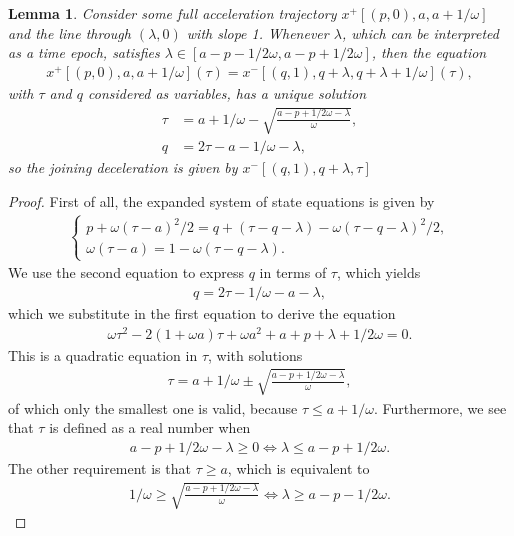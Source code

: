 \documentclass[a4paper]{article}
\theoremstyle{definition}
\theoremstyle{plain}
\newtheorem{lemma}{Lemma}
\begin{document}
\begin{lemma}
  \label{lemma:line_acc}
  Consider some full acceleration trajectory $x^{+}[(p, 0), a, a+1/\omega]$ and the
  line through $(\lambda, 0)$ with slope 1. Whenever $\lambda$, which can be
  interpreted as a time epoch, satisfies $\lambda \in [a-p-1/2\omega, a-p+1/2\omega]$, then the equation
  \begin{align*}
    x^{+}[(p, 0), a, a+1/\omega](\tau) = x^{-}[(q, 1), q + \lambda, q + \lambda + 1/\omega](\tau) ,
  \end{align*}
  with $\tau$ and $q$ considered as variables, has a unique solution
  \begin{align*}
    \tau &= a + 1/\omega - \sqrt{\frac{a - p + 1/2\omega - \lambda}{\omega}} , \\
    q &= 2\tau - a - 1/\omega - \lambda ,
  \end{align*}
  so the joining deceleration is given by $x^{-}[(q,1), q + \lambda, \tau]$
\end{lemma}
\begin{proof}
  First of all, the expanded system of state equations is given by
  \begin{align*}
    \begin{cases}
    p + \omega (\tau - a)^{2}/2 = q + (\tau - q - \lambda) - \omega (\tau - q - \lambda)^{2}/2 , \\
    \omega(\tau - a) = 1 - \omega(\tau - q - \lambda) .
      \end{cases}
  \end{align*}
  We use the second equation to express $q$ in terms of $\tau$, which yields
  \begin{align*}
    q = 2\tau - 1/\omega -a - \lambda ,
  \end{align*}
  which we substitute in the first equation to derive the equation
  \begin{align*}
    \omega \tau^{2}  - 2 (1 + \omega a) \tau + \omega a^{2} + a + p + \lambda + 1/2\omega = 0 .
  \end{align*}
  This is a quadratic equation in $\tau$, with solutions
  \begin{align*}
    \tau = a + 1/\omega \pm \sqrt{\frac{a - p + 1/2\omega - \lambda}{\omega}} ,
  \end{align*}
  of which only the smallest one is valid, because $\tau \leq a + 1/\omega$.
  Furthermore, we see that $\tau$ is defined as a real number when
  \begin{align*}
    a - p + 1/2\omega - \lambda \geq 0 \iff \lambda \leq a - p + 1/2\omega .
  \end{align*}
  The other requirement is that $\tau \geq a$, which is equivalent to
  \begin{align*}
    1/\omega \geq \sqrt{\frac{a - p + 1/2\omega - \lambda}{\omega}} \iff
    \lambda \geq a - p - 1/2\omega .
  \end{align*}
\end{proof}
\end{document}
